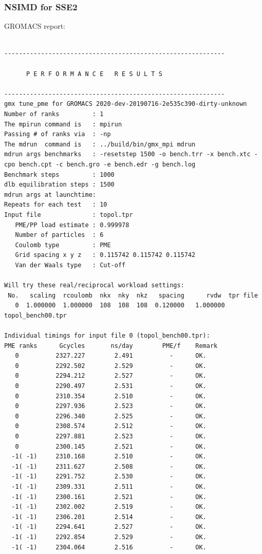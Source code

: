 \subsubsection{NSIMD for SSE2}
GROMACS report: \\
\begin{lstlisting}[frame=single]

------------------------------------------------------------

      P E R F O R M A N C E   R E S U L T S

------------------------------------------------------------
gmx tune_pme for GROMACS 2020-dev-20190716-2e535c390-dirty-unknown
Number of ranks         : 1
The mpirun command is   : mpirun
Passing # of ranks via  : -np
The mdrun  command is   : ../build/bin/gmx_mpi mdrun
mdrun args benchmarks   : -resetstep 1500 -o bench.trr -x bench.xtc -cpo bench.cpt -c bench.gro -e bench.edr -g bench.log 
Benchmark steps         : 1000
dlb equilibration steps : 1500
mdrun args at launchtime: 
Repeats for each test   : 10
Input file              : topol.tpr
   PME/PP load estimate : 0.999978
   Number of particles  : 6
   Coulomb type         : PME
   Grid spacing x y z   : 0.115742 0.115742 0.115742
   Van der Waals type   : Cut-off

Will try these real/reciprocal workload settings:
 No.   scaling  rcoulomb  nkx  nky  nkz   spacing      rvdw  tpr file
   0  1.000000  1.000000  108  108  108  0.120000   1.000000  topol_bench00.tpr

Individual timings for input file 0 (topol_bench00.tpr):
PME ranks      Gcycles       ns/day        PME/f    Remark
   0          2327.227        2.491          -      OK.
   0          2292.502        2.529          -      OK.
   0          2294.212        2.527          -      OK.
   0          2290.497        2.531          -      OK.
   0          2310.354        2.510          -      OK.
   0          2297.936        2.523          -      OK.
   0          2296.340        2.525          -      OK.
   0          2308.574        2.512          -      OK.
   0          2297.881        2.523          -      OK.
   0          2300.145        2.521          -      OK.
  -1( -1)     2310.168        2.510          -      OK.
  -1( -1)     2311.627        2.508          -      OK.
  -1( -1)     2291.752        2.530          -      OK.
  -1( -1)     2309.331        2.511          -      OK.
  -1( -1)     2300.161        2.521          -      OK.
  -1( -1)     2302.002        2.519          -      OK.
  -1( -1)     2306.201        2.514          -      OK.
  -1( -1)     2294.641        2.527          -      OK.
  -1( -1)     2292.854        2.529          -      OK.
  -1( -1)     2304.064        2.516          -      OK.


\end{lstlisting}

